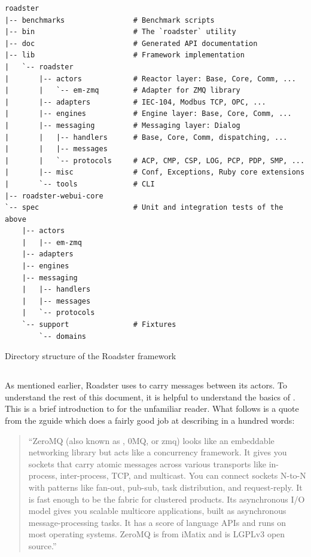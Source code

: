 \begin{listing}
	\begin{verbatim}
roadster
|-- benchmarks                # Benchmark scripts
|-- bin                       # The `roadster` utility
|-- doc                       # Generated API documentation
|-- lib                       # Framework implementation
|   `-- roadster
|       |-- actors            # Reactor layer: Base, Core, Comm, ...
|       |   `-- em-zmq        # Adapter for ZMQ library
|       |-- adapters          # IEC-104, Modbus TCP, OPC, ...
|       |-- engines           # Engine layer: Base, Core, Comm, ...
|       |-- messaging         # Messaging layer: Dialog
|       |   |-- handlers      # Base, Core, Comm, dispatching, ...
|       |   |-- messages
|       |   `-- protocols     # ACP, CMP, CSP, LOG, PCP, PDP, SMP, ...
|       |-- misc              # Conf, Exceptions, Ruby core extensions
|       `-- tools             # CLI
|-- roadster-webui-core
`-- spec                      # Unit and integration tests of the above
    |-- actors
    |   |-- em-zmq
    |-- adapters
    |-- engines
    |-- messaging
    |   |-- handlers
    |   |-- messages
    |   `-- protocols
    `-- support               # Fixtures
        `-- domains
  \end{verbatim}
  \caption{Directory structure of the Roadster framework}
  \label{lst:roadster:directory-structure}
\end{listing}




\subsection{\zmq}\label{sec:scope:zmq}
As mentioned earlier, Roadster uses \zmq to carry messages between its actors.
To understand the rest of this document, it is
helpful to understand the basics of \zmq. This is a brief introduction to
\zmq for the unfamiliar reader. What follows is a quote from the \gls{zguide}
which does a fairly good job at describing \zmq in a hundred words:

\begin{quote}
``ZeroMQ (also known as \zmq, 0MQ, or zmq) looks like an embeddable networking
library but acts like a concurrency framework. It gives you sockets that carry
atomic messages across various transports like in-process, inter-process, TCP,
and multicast. You can connect sockets N-to-N with patterns like fan-out,
pub-sub, task distribution, and request-reply. It is fast enough to be the
fabric for clustered products. Its asynchronous I/O model gives you scalable
multicore applications, built as asynchronous message-processing tasks. It has
a score of language APIs and runs on most operating systems.  ZeroMQ is from
iMatix and is LGPLv3 open source.''
\end{quote}

